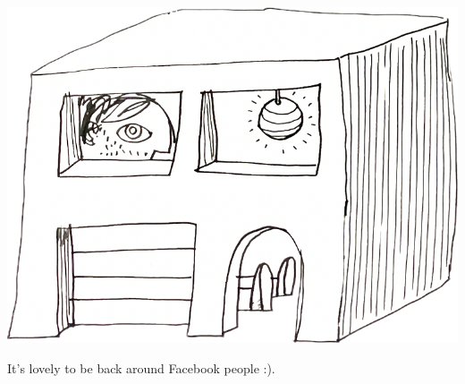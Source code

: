 \documentclass[
  10pt,
  ignorenonframetext,
]{beamer}
\author{}
\date{}
\providecommand{\tightlist}{%
  \setlength{\itemsep}{0pt}\setlength{\parskip}{0pt}}\usepackage{longtable,booktabs,array}
\begin{document}
\begin{frame}{}
\label{section}
\includegraphics{images/2024-11-11-14-45-57.png}

\begin{description}
\tightlist
\item[Hi.]
It's lovely to be back around Facebook people :).
\end{description}
\end{frame}
\end{document}
